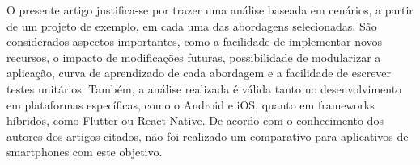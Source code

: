 O presente artigo justifica-se por trazer uma análise baseada em cenários, a partir de um projeto de exemplo, em cada uma das abordagens selecionadas.
São considerados aspectos importantes, como a facilidade de implementar novos recursos, o impacto de modificações futuras, possibilidade de modularizar a aplicação, curva de aprendizado de cada abordagem e a facilidade de escrever testes unitários.
Também, a análise realizada é válida tanto no desenvolvimento em plataformas específicas, como o Android e iOS, quanto em frameworks híbridos, como Flutter ou React Native.
De acordo com o conhecimento dos autores dos artigos citados, não foi realizado um comparativo para aplicativos de smartphones com este objetivo.

\clearpage